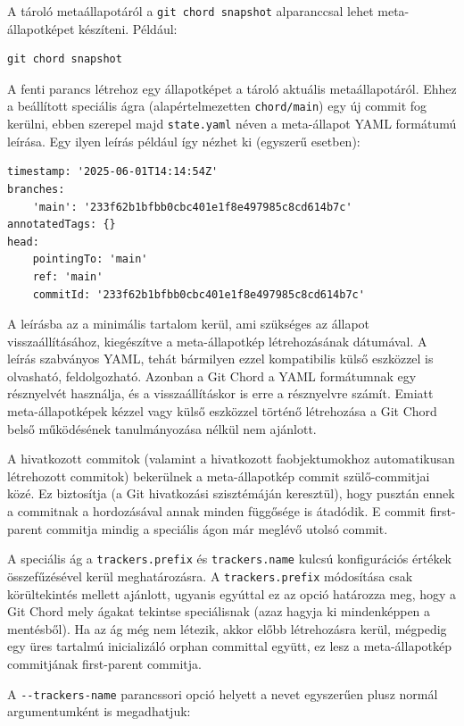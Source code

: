\documentclass[
]{elteikthesis}[2025/03/25]
\begin{document}
A tároló metaállapotáról a \verb|git chord snapshot| alparanccsal lehet meta-állapotképet készíteni.
Például:

\begin{verbatim}
git chord snapshot
\end{verbatim}

A fenti parancs létrehoz egy állapotképet a tároló aktuális metaállapotáról.
Ehhez a beállított speciális ágra (alapértelmezetten \verb|chord/main|) egy új commit fog kerülni,
ebben szerepel majd \verb|state.yaml| néven a meta-állapot YAML formátumú leírása.
Egy ilyen leírás például így nézhet ki (egyszerű esetben):

\begin{verbatim}
timestamp: '2025-06-01T14:14:54Z'
branches:
    'main': '233f62b1bfbb0cbc401e1f8e497985c8cd614b7c'
annotatedTags: {}
head:
    pointingTo: 'main'
    ref: 'main'
    commitId: '233f62b1bfbb0cbc401e1f8e497985c8cd614b7c'
\end{verbatim}

A leírásba az a minimális tartalom kerül, ami szükséges az állapot visszaállításához,
kiegészítve a meta-állapotkép létrehozásának dátumával.
A leírás szabványos YAML, tehát bármilyen ezzel kompatibilis
külső eszközzel is olvasható, feldolgozható.
Azonban a Git Chord a YAML formátumnak egy résznyelvét használja,
és a visszaállításkor is erre a résznyelvre számít.
Emiatt meta-állapotképek kézzel vagy külső eszközzel történő létrehozása
a Git Chord belső működésének tanulmányozása nélkül nem ajánlott.

A hivatkozott commitok (valamint a hivatkozott faobjektumokhoz automatikusan létrehozott commitok)
bekerülnek a meta-állapotkép commit szülő-commitjai közé.
Ez biztosítja (a Git hivatkozási szisztémáján keresztül),
hogy pusztán ennek a commitnak a hordozásával annak minden függősége is átadódik.
E commit first-parent commitja mindig a speciális ágon már meglévő utolsó commit.

A speciális ág a \verb|trackers.prefix| és \verb|trackers.name| kulcsú konfigurációs értékek összefűzésével kerül meghatározásra.
A \verb|trackers.prefix| módosítása csak körültekintés mellett ajánlott,
ugyanis egyúttal ez az opció határozza meg,
hogy a Git Chord mely ágakat tekintse speciálisnak
(azaz hagyja ki mindenképpen a mentésből).
Ha az ág még nem létezik, akkor előbb létrehozásra kerül,
mégpedig egy üres tartalmú inicializáló orphan committal együtt,
ez lesz a meta-állapotkép commitjának first-parent commitja.

A \verb|--trackers-name| parancssori opció helyett a nevet egyszerűen plusz normál argumentumként is megadhatjuk:
\end{document}
